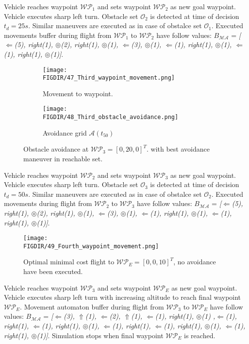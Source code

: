\newpage
\noindent Vehicle reaches waypoint $\mathscr{WP}_1$ and sets waypoint $\mathscr{WP}_2$ as new goal waypoint. Vehicle executes sharp left turn. Obstacle set $\mathscr{O}_2$ is detected at time of decision $t_d=25s$. Similar maneuvers are executed as in case of obstalce set $\mathscr{O}_1$.
Executed movements buffer during flight from $\mathscr{WP}_1$ to $\mathscr{WP}_2$ have follow values: $B_{\mathscr{MA}}$ = \textit{[$\Leftarrow$(5), right(1), $\circledcirc$(2), right(1), $\circledcirc$(1), $\Leftarrow$(3), $\circledcirc$(1), $\Leftarrow$(1), right(1), $\circledcirc$(1), $\Leftarrow$(1), right(1), $\circledcirc$(1)]}.
\begin{figure}[H]
    \begin{subfigure}{0.5\textwidth}
    \texttt{[image: \\FIGDIR/47\_Third\_waypoint\_movement.png]} 
    \caption{Movement to waypoint.}
    \label{fig:47thirdwaypointMovement}
    \end{subfigure}
    \begin{subfigure}{0.5\textwidth}
    \texttt{[image: \\FIGDIR/48\_Third\_obstacle\_avoidance.png]}
    \caption{Avoidance grid $\mathscr{A}(t_{50})$}
    \label{fig:48ObstacleAvoidance}
    \end{subfigure}
\caption{Obstacle avoidance at $\mathscr{WP}_3=[0,20,0]^T$. with best avoidance maneuver in reachable set.}
\label{fig:thirdObstacleGrid}
\end{figure}
\noindent Vehicle reaches waypoint $\mathscr{WP}_2$ and sets waypoint $\mathscr{WP}_3$ as new goal waypoint. Vehicle executes sharp left turn. Obstacle set $\mathscr{O}_3$ is detected at time of decision $t_d=50s$. Similar maneuvers are executed as in case of obstalce set $\mathscr{O}_2$.
Executed movements during flight from $\mathscr{WP}_2$ to $\mathscr{WP}_3$ have follow values: $B_{\mathscr{MA}}$ = \textit{[$\Leftarrow$(5), right(1), $\circledcirc$(2), right(1), $\circledcirc$(1), $\Leftarrow$(3), $\circledcirc$(1), $\Leftarrow$(1), right(1), $\circledcirc$(1), $\Leftarrow$(1), right(1), $\circledcirc$(1)]}.
\begin{figure}[H]
    \centering
    \texttt{[image: \\FIGDIR/49\_Fourth\_waypoint\_movement.png]}
    \caption{Optimal minimal cost flight to $\mathscr{WP}_E=[0,0,10]^T$, no avoidance have been executed.}
    \label{fig:fourthObstacleGrid}
\end{figure}
\newpage
\noindent Vehicle reaches waypoint $\mathscr{WP}_3$ and sets waypoint $\mathscr{WP}_E$ as new goal waypoint. Vehicle executes sharp left turn with increasing altitude to reach final waypoint $\mathscr{WP}_E$. 
Movement automaton buffer during flight from $\mathscr{WP}_3$ to $\mathscr{WP}_E$ have follow values: $B_{\mathscr{MA}}$ = \textit{[$\Leftarrow$(3), $\Uparrow$(1), $\Leftarrow$(2), $\Uparrow$(1), $\Leftarrow$(1), right(1), $\circledcirc$(1) ,$\Leftarrow$(1), right(1), $\Leftarrow$(1), right(1), $\circledcirc$(1), $\Leftarrow$(1), right(1), $\Leftarrow$(1), right(1), $\circledcirc$(1), $\Leftarrow$(1), right(1), $\circledcirc$(1)]}.
Simulation stops when final waypoint $\mathscr{WP}_E$ is reached.

